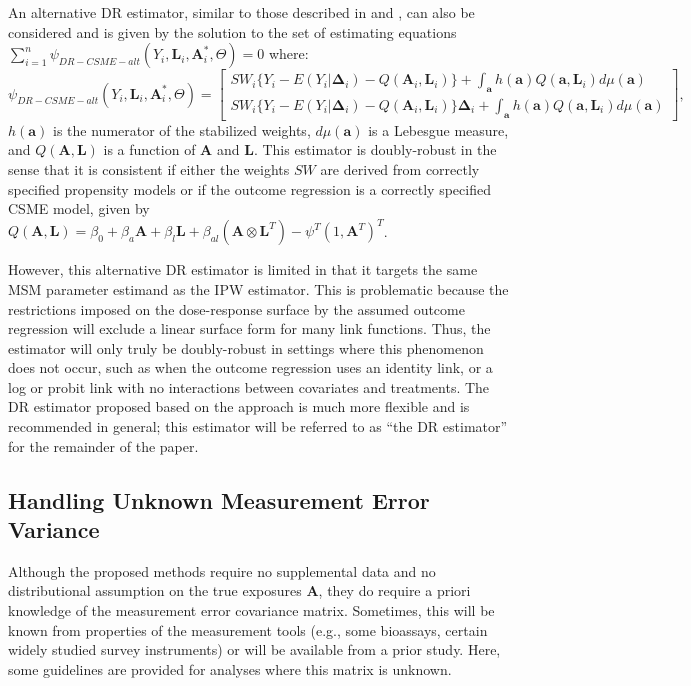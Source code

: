 \documentclass[useAMS,usenatbib,referee]{biom}
\begin{document}
An alternative DR estimator, similar to those described in \citet{robins2000b} and \citet{neugebauer2005}, can also be considered and is given by the solution to the set of estimating equations $\sum_{i=1}^{n} \psi_{DR-CSME-alt}(Y_{i}, \bm{L}_{i}, \bm{A}^{*}_{i}, \Theta) = 0$ where:
\begin{equation*}
    \psi_{DR-CSME-alt}(Y_{i}, \bm{L}_{i}, \bm{A}^{*}_{i}, \Theta) =
    \begin{bmatrix}
       SW_{i} \{ Y_{i} - E(Y_{i} | \bm{\Delta}_{i}) - Q(\bm{A}_{i}, \bm{L}_{i}) \} + \int_{\bm{a}} h(\bm{a})Q(\bm{a}, \bm{L}_{i})d\mu (\bm{a}) \\
       SW_{i} \{ Y_{i} - E(Y_{i} | \bm{\Delta}_{i}) - Q(\bm{A}_{i}, \bm{L}_{i}) \} \bm{\Delta}_{i} + \int_{\bm{a}} h(\bm{a})Q(\bm{a}, \bm{L}_{i})d\mu (\bm{a})
    \end{bmatrix},
\end{equation*}
$h(\bm{a})$ is the numerator of the stabilized weights, $d\mu (\bm{a})$ is a Lebesgue measure, and $Q(\bm{A}, \bm{L})$ is a function of $\bm{A}$ and $\bm{L}$. This estimator is doubly-robust in the sense that it is consistent if either the weights $SW$ are derived from correctly specified propensity models or if the outcome regression is a correctly specified CSME model, given by $Q(\bm{A}, \bm{L}) = \beta_{0} + \beta_{a}\bm{A} + \beta_{l}\bm{L} + \beta_{al}(\bm{A} \otimes \bm{L}^{T}) - \psi^{T}(1, \bm{A}^{T})^{T}$.

However, this alternative DR estimator is limited in that it targets the same MSM parameter estimand as the IPW estimator. This is problematic because the restrictions imposed on the dose-response surface by the assumed outcome regression will exclude a linear surface form for many link functions. Thus, the estimator will only truly be doubly-robust in settings where this phenomenon does not occur, such as when the outcome regression uses an identity link, or a log or probit link with no interactions between covariates and treatments. The DR estimator proposed based on the \citet{hirano2001} approach is much more flexible and is recommended in general; this estimator will be referred to as ``the DR estimator'' for the remainder of the paper.

\subsection{Handling Unknown Measurement Error Variance}

Although the proposed methods require no supplemental data and no distributional assumption on the true exposures $\bm{A}$, they do require a priori knowledge of the measurement error covariance matrix. Sometimes, this will be known from properties of the measurement tools (e.g., some bioassays, certain widely studied survey instruments) or will be available from a prior study. Here, some guidelines are provided for analyses where this matrix is unknown.
\end{document}
